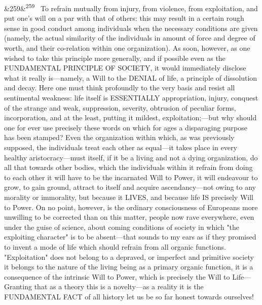 \documentclass[12pt]{article}
\newcommand{\para}[1][]{\par\noindent\ifx&#1&\else\textsuperscript{\footnotesize #1}~\fi}
\begin{document}
\para[259] To refrain mutually from injury, from violence, from exploitation, and put one's will on a par with that of others: this may result in a certain rough sense in good conduct among individuals when the necessary conditions are given (namely, the actual similarity of the individuals in amount of force and degree of worth, and their co-relation within one organization). As soon, however, as one wished to take this principle more generally, and if possible even as the FUNDAMENTAL PRINCIPLE OF SOCIETY, it would immediately disclose what it really is---namely, a Will to the DENIAL of life, a principle of dissolution and decay. Here one must think profoundly to the very basis and resist all sentimental weakness: life itself is ESSENTIALLY appropriation, injury, conquest of the strange and weak, suppression, severity, obtrusion of peculiar forms, incorporation, and at the least, putting it mildest, exploitation;---but why should one for ever use precisely these words on which for ages a disparaging purpose has been stamped? Even the organization within which, as was previously supposed, the individuals treat each other as equal---it takes place in every healthy aristocracy---must itself, if it be a living and not a dying organization, do all that towards other bodies, which the individuals within it refrain from doing to each other it will have to be the incarnated Will to Power, it will endeavour to grow, to gain ground, attract to itself and acquire ascendancy---not owing to any morality or immorality, but because it LIVES, and because life IS precisely Will to Power. On no point, however, is the ordinary consciousness of Europeans more unwilling to be corrected than on this matter, people now rave everywhere, even under the guise of science, about coming conditions of society in which "the exploiting character" is to be absent---that sounds to my ears as if they promised to invent a mode of life which should refrain from all organic functions. "Exploitation" does not belong to a depraved, or imperfect and primitive society it belongs to the nature of the living being as a primary organic function, it is a consequence of the intrinsic Will to Power, which is precisely the Will to Life---Granting that as a theory this is a novelty---as a reality it is the FUNDAMENTAL FACT of all history let us be so far honest towards ourselves!
\end{document}
